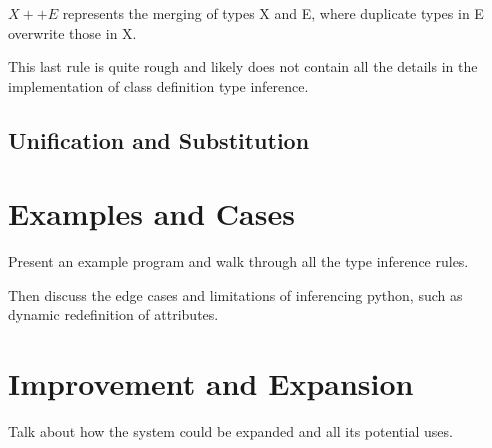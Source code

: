 \documentclass{article}
\begin{document}
$X ++ E$ represents the merging of types X and E, where duplicate types in E overwrite those in X.

This last rule is quite rough and likely does not contain all the details in
the implementation of class definition type inference.

\subsection*{Unification and Substitution}

\section*{Examples and Cases}

Present an example program and walk through all the type inference rules. 

Then discuss the edge cases and limitations of inferencing python, such as dynamic redefinition of attributes.

\section*{Improvement and Expansion}

Talk about how the system could be expanded and all its potential uses.
\end{document}

